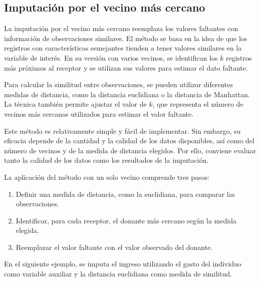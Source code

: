 \documentclass[
  spanish,
  11pt,
  letterpaper,
  oneside,
  open=any]{scrbook}
\providecommand{\tightlist}{%
  \setlength{\itemsep}{0pt}\setlength{\parskip}{0pt}}
\begin{document}
\subsection{Imputación por el vecino más
cercano}\label{imputaciuxf3n-por-el-vecino-muxe1s-cercano}

La imputación por el vecino más cercano reemplaza los valores faltantes
con información de observaciones similares. El método se basa en la idea
de que los registros con características semejantes tienden a tener
valores similares en la variable de interés. En su versión con varios
vecinos, se identifican los \(k\) registros más próximos al receptor y
se utilizan sus valores para estimar el dato faltante.

Para calcular la similitud entre observaciones, se pueden utilizar
diferentes medidas de distancia, como la distancia euclidiana o la
distancia de Manhattan. La técnica también permite ajustar el valor de
\(k\), que representa el número de vecinos más cercanos utilizados para
estimar el valor faltante.

Este método es relativamente simple y fácil de implementar. Sin embargo,
su eficacia depende de la cantidad y la calidad de los datos
disponibles, así como del número de vecinos y de la medida de distancia
elegidos. Por ello, conviene evaluar tanto la calidad de los datos como
los resultados de la imputación.

La aplicación del método con un solo vecino comprende tres pasos:

\begin{enumerate}
\def\labelenumi{\arabic{enumi}.}
\tightlist
\item
  Definir una medida de distancia, como la euclidiana, para comparar las
  observaciones.
\item
  Identificar, para cada receptor, el donante más cercano según la
  medida elegida.
\item
  Reemplazar el valor faltante con el valor observado del donante.
\end{enumerate}

En el siguiente ejemplo, se imputa el ingreso utilizando el gasto del
individuo como variable auxiliar y la distancia euclidiana como medida
de similitud.
\end{document}
